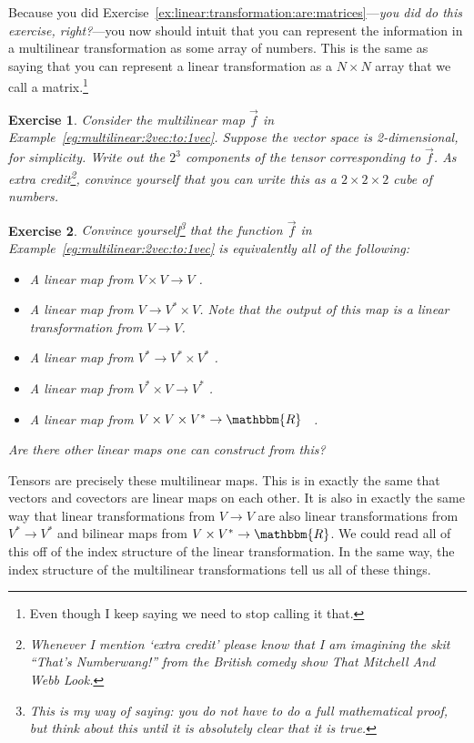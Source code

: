 \documentclass[
  11pt,
	colorful,
	raggedright,
]{tufte-style-thesis-flip}
\newtheorem{exercise}{Exercise}[section]
\begin{document}
Because you did Exercise~\eqref{ex:linear:transformation:are:matrices}---\emph{you did do this exercise, right?}---you now should intuit that you can represent the information in a multilinear transformation as some array of numbers. This is the same as saying that you can represent a linear transformation as a $N\times N$ array that we call a matrix.\footnote{Even though I keep saying we need to stop calling it that.} 

\begin{exercise}
Consider the multilinear map $\vec{f}$ in Example~\ref{eg:multilinear:2vec:to:1vec}. Suppose the vector space is 2-dimensional, for simplicity. Write out the $2^3$ components of the tensor corresponding to $\vec{f}$. As extra credit\footnote{Whenever I mention `extra credit' please know that I am imagining the skit ``That's Numberwang!'' from the British comedy show \emph{That Mitchell And Webb Look}.}, convince yourself that you can write this as a $2\times 2\times 2$ cube of numbers. 
\end{exercise}

\begin{exercise}
Convince yourself\footnote{This is my way of saying: you do not have to do a full mathematical proof, but think about this until it is absolutely clear that it is true.} that the function $\vec{f}$ in Example~\ref{eg:multilinear:2vec:to:1vec} is \emph{equivalently} all of the following:
\begin{itemize}
  \item A linear map from $V\times V \to V$ .
  \item A linear map from $V \to  V^*\times V$. Note that the output of this map is a linear transformation from $V\to V$. 
  \item A linear map from $V^*\to V^* \times V^*$ .
  \item A linear map from $V^*\times V \to V^*$ .
  \item A linear map from $V \times V \times V^* \to \mathbbm{R}$ \ .
\end{itemize}
Are there other linear maps one can construct from this? 
\end{exercise}
Tensors are precisely these multilinear maps. This is in exactly the same that vectors and covectors are linear maps on each other. It is also in exactly the same way that linear transformations from $V\to V$ are also linear transformations from $V^*\to V^*$ and bilinear maps from $V\times V^* \to \mathbbm{R}$. We could read all of this off of the index structure of the linear transformation. In the same way, the index structure of the multilinear transformations tell us all of these things.
\end{document}
